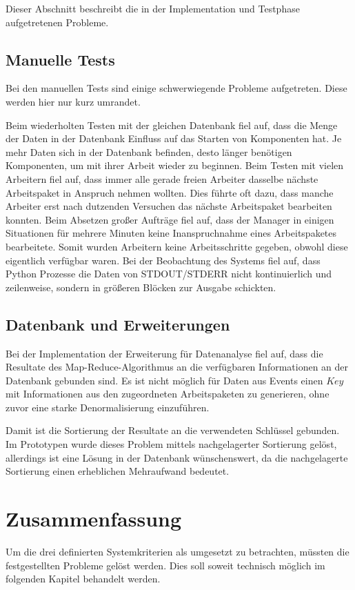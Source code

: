 Dieser Abschnitt  beschreibt die in der Implementation und Testphase aufgetretenen Probleme.

\subsection{Manuelle Tests}

Bei den manuellen Tests sind einige schwerwiegende Probleme aufgetreten.
Diese werden hier nur kurz umrandet.

\begin{itemize}
        Beim wiederholten Testen mit der gleichen Datenbank fiel auf,
        dass die Menge der Daten in der Datenbank Einfluss auf das Starten von Komponenten hat.
        Je mehr Daten sich in der Datenbank befinden, desto länger benötigen Komponenten,
        um mit ihrer Arbeit wieder zu beginnen.
        Beim Testen mit vielen Arbeitern fiel auf, dass immer alle gerade freien Arbeiter
        dasselbe nächste Arbeitspaket in Anspruch nehmen wollten. Dies führte oft dazu,
        dass manche Arbeiter erst nach dutzenden Versuchen das nächste Arbeitspaket bearbeiten konnten.
        Beim Absetzen großer Aufträge fiel auf, dass der Manager in einigen Situationen
        für mehrere Minuten keine Inanspruchnahme eines Arbeitspaketes bearbeitete.
        Somit wurden Arbeitern keine Arbeitsschritte gegeben, obwohl diese eigentlich verfügbar waren.
        Bei der Beobachtung des Systems fiel auf, dass Python Prozesse
        die Daten von STDOUT/STDERR nicht kontinuierlich und zeilenweise,
        sondern in größeren Blöcken zur Ausgabe schickten.
\end{itemize}


\subsection{Datenbank und Erweiterungen}

Bei der Implementation der Erweiterung für Datenanalyse fiel auf,
dass die Resultate des Map-Reduce-Algorithmus an die verfügbaren Informationen an der Datenbank gebunden sind.
Es ist nicht möglich für Daten aus Events einen $Key$ mit Informationen aus den zugeordneten Arbeitspaketen zu generieren, ohne zuvor eine starke Denormalisierung einzuführen.

Damit ist die Sortierung der Resultate an die verwendeten Schlüssel gebunden. 
Im Prototypen wurde dieses Problem mittels nachgelagerter Sortierung gelöst,
allerdings ist eine Lösung in der Datenbank wünschenswert, da die nachgelagerte Sortierung einen erheblichen Mehraufwand bedeutet.


\section{Zusammenfassung}
\label{sec:eval:zusammenfassung}
Um die drei definierten Systemkriterien als umgesetzt zu betrachten,
müssten die festgestellten Probleme gelöst werden.
Dies soll soweit technisch möglich im folgenden Kapitel behandelt werden.


